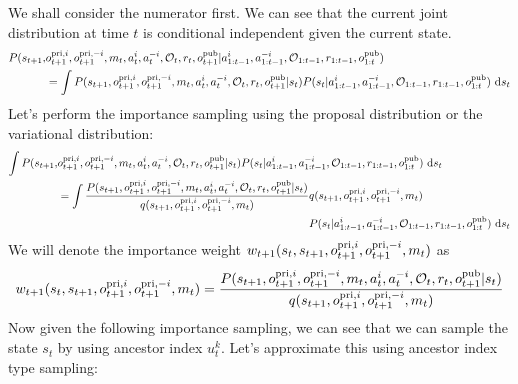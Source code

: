 We shall consider the numerator first. We can see that the current joint distribution at time $t$ is conditional independent given the current state.
\begin{equation}
\begin{aligned}
    P(s_{t+1}, &o^{\operatorname{pri}, i}_{t+1}, o^{\operatorname{pri}, -i}_{t+1}, m_t, a^i_t, a^{-i}_t, \mathcal{O}_t, r_t , o^{\operatorname{pub}}_{t+1}| a^{i}_{1:t-1}, a^{-i}_{1:t-1}, \mathcal{O}_{1:t-1}, r_{1:t-1}, o^{\operatorname{pub}}_{1:t}) \\
    &= \int P(s_{t+1}, o^{\operatorname{pri}, i}_{t+1}, o^{\operatorname{pri}, -i}_{t+1}, m_t, a^i_t, a^{-i}_t, \mathcal{O}_t, r_t , o^{\operatorname{pub}}_{t+1} | s_t) 
    P(s_t | a^{i}_{1:t-1}, a^{-i}_{1:t-1}, \mathcal{O}_{1:t-1}, r_{1:t-1}, o^{\operatorname{pub}}_{1:t}) \ \mathrm{d} s_t
\end{aligned}
\end{equation}
Let's perform the importance sampling using the proposal distribution or the variational distribution:
\begin{equation}
\begin{aligned}
    \int P(s_{t+1}, &o^{\operatorname{pri}, i}_{t+1}, o^{\operatorname{pri}, -i}_{t+1}, m_t, a^i_t, a^{-i}_t, \mathcal{O}_t, r_t , o^{\operatorname{pub}}_{t+1} | s_t) 
    P(s_t | a^{i}_{1:t-1}, a^{-i}_{1:t-1}, \mathcal{O}_{1:t-1}, r_{1:t-1}, o^{\operatorname{pub}}_{1:t})\ \mathrm{d} s_t \\
    &= \begin{aligned}[t]
        \int \frac{P(s_{t+1}, o^{\operatorname{pri}, i}_{t+1}, o^{\operatorname{pri}, -i}_{t+1}, m_t, a^i_t, a^{-i}_t, \mathcal{O}_t, r_t , o^{\operatorname{pub}}_{t+1} | s_t)}{q(s_{t+1}, o^{\operatorname{pri}, i}_{t+1}, o^{\operatorname{pri}, -i}_{t+1}, m_t)} &q(s_{t+1}, o^{\operatorname{pri}, i}_{t+1}, o^{\operatorname{pri}, -i}_{t+1}, m_t) \\
        &P(s_t | a^{i}_{1:t-1}, a^{-i}_{1:t-1}, \mathcal{O}_{1:t-1}, r_{1:t-1}, o^{\operatorname{pub}}_{1:t}) \ \mathrm{d} s_t
    \end{aligned}
\end{aligned}
\end{equation}
We will denote the importance weight $w_{t+1}(s_t, s_{t+1}, o^{\operatorname{pri}, i}_{t+1}, o^{\operatorname{pri}, -i}_{t+1}, m_t)$ as 
\begin{equation}
    w_{t+1}(s_t, s_{t+1}, o^{\operatorname{pri}, i}_{t+1}, o^{\operatorname{pri}, -i}_{t+1}, m_t) = \frac{P(s_{t+1}, o^{\operatorname{pri}, i}_{t+1}, o^{\operatorname{pri}, -i}_{t+1}, m_t, a^i_t, a^{-i}_t, \mathcal{O}_t, r_t , o^{\operatorname{pub}}_{t+1} | s_t)}{q(s_{t+1}, o^{\operatorname{pri}, i}_{t+1}, o^{\operatorname{pri}, -i}_{t+1}, m_t)}
\end{equation}
Now given the following importance sampling, we can see that we can sample the state $s_t$ by using ancestor index $u^k_t$. Let's approximate this using ancestor index type sampling:
